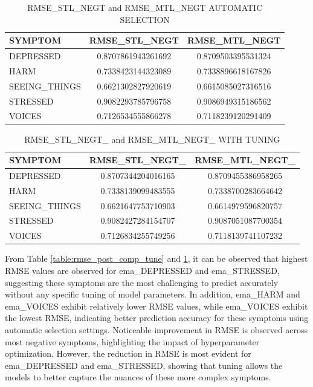 \begin{table}[H]
\centering
\caption{ RMSE\_STL\_NEGT and RMSE\_MTL\_NEGT AUTOMATIC SELECTION}
\label{table:rmse_negt_comparison}
\begin{tabular}{|l|c|c|}
\hline
\textbf{SYMPTOM} & \textbf{RMSE\_STL\_NEGT} & \textbf{RMSE\_MTL\_NEGT} \\ \hline
DEPRESSED & 0.8707861943261692 & 0.8709503395531324 \\ \hline
HARM & 0.7338423144323089 & 0.7338896618167826 \\ \hline
SEEING\_THINGS & 0.6621302827920619 & 0.6615085027316516 \\ \hline
STRESSED & 0.9082293785796758 & 0.9086949315186562 \\ \hline
VOICES & 0.7126534555866278 & 0.7118239120291409 \\ \hline
\end{tabular}
\end{table}


\begin{table}[H]
\centering
\caption{RMSE\_STL\_NEGT\_ and RMSE\_MTL\_NEGT\_ WITH TUNING}
\label{table:rmse_negt_compar_tune}
\begin{tabular}{|l|c|c|}
\hline
\textbf{SYMPTOM} & \textbf{RMSE\_STL\_NEGT\_} & \textbf{RMSE\_MTL\_NEGT\_} \\ \hline
DEPRESSED & 0.8707344204016165 & 0.8709455386958265 \\ \hline
HARM & 0.7338139099483555 & 0.7338700283664642 \\ \hline
SEEING\_THINGS & 0.6621647753710903 & 0.6614979596820757 \\ \hline
STRESSED & 0.9082427284154707 & 0.9087051087700354 \\ \hline
VOICES & 0.7126834255749256 & 0.7118139741107232 \\ \hline
\end{tabular}
\end{table}





From Table \ref{table:rmse_post_comp_tune} and \ref{table:rmse_negt_comparison}, it can be observed that highest RMSE values are observed for ema\_DEPRESSED and ema\_STRESSED, suggesting these symptoms are the most challenging to predict accurately without any specific tuning of model parameters. In addition, ema\_HARM and ema\_VOICES exhibit relatively lower RMSE values, while ema\_VOICES exhibit the lowest RMSE, indicating better prediction accuracy for these symptoms using automatic selection settings. Noticeable improvement in RMSE is observed across most negative symptoms, highlighting the impact of hyperparameter optimization. However, the reduction in RMSE is most evident for ema\_DEPRESSED and ema\_STRESSED, showing that tuning allows the models to better capture the nuances of these more complex symptoms.

